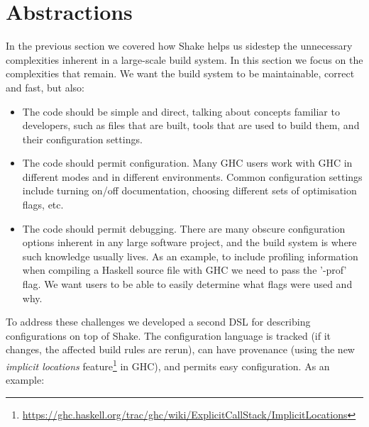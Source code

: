 \section{Abstractions\label{sec:abstractions}}


In the previous section we covered how Shake helps us sidestep the unnecessary
complexities inherent in a large-scale build system. In this section we focus on
the complexities that remain. We want the build system to be maintainable, correct
and fast, but also:

\begin{itemize}
\item The code should be simple and direct, talking about concepts familiar to
developers, such as files that are built, tools that are used to build
them, and their configuration settings.
\item The code should permit configuration. Many GHC users work with GHC in
different modes and in different environments. Common configuration settings
include turning on/off documentation, choosing different sets of optimisation flags,
etc.
\item The code should permit debugging. There are many obscure configuration
options inherent in any large software project, and the build system is where
such knowledge usually lives. As an example, to include profiling information
when compiling a Haskell source file with GHC we need to pass the \lst'-prof' flag.
We want users to be able to easily determine what flags were used and why.
\end{itemize}
\noindent
To address these challenges we developed a
second DSL for describing configurations on top of Shake.
The configuration language is tracked (if it changes, the affected build rules
are rerun), can have provenance (using the new \emph{implicit locations}
feature\footnote{\scriptsize{}\url{https://ghc.haskell.org/trac/ghc/wiki/ExplicitCallStack/ImplicitLocations}$\!\!\!$}
in GHC), and permits easy configuration. As an example:

